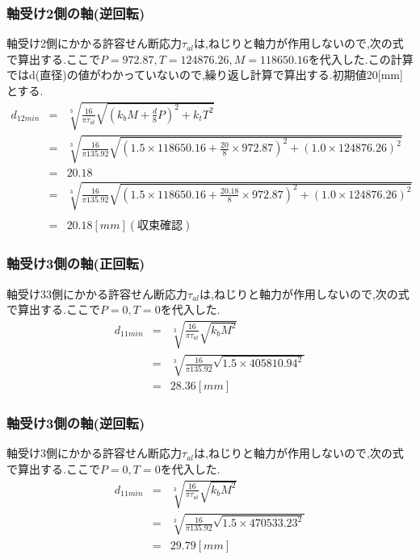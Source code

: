 \subsubsection{軸受け2側の軸(逆回転)}
軸受け2側にかかる許容せん断応力$\tau_{al}$は,ねじりと軸力が作用しないので,次の式で算出する.ここで$P=972.87,T=124876.26, M=118650.16$を代入した.この計算ではd(直径)の値がわかっていないので,繰り返し計算で算出する.初期値20[mm]とする.
\begin{eqnarray}
d_{12min}&=& \sqrt [3]{ \frac{16}{\pi \tau_{al}}\sqrt{(k_bM+\frac{d}{8}P)^2+k_tT^2} }\\
       &=& \sqrt [3]{ \frac{16}{\pi 135.92} \sqrt{(1.5 \times 118650.16 +\frac{20}{8}\times 972.87)^2+(1.0 \times 124876.26)^2} }\\
       &=&20.18\\
       &=& \sqrt [3]{ \frac{16}{\pi 135.92} \sqrt{(1.5 \times 118650.16 +\frac{20.18}{8}\times 972.87)^2+(1.0 \times 124876.26)^2} }\nonumber\\
\\
       &=&20.18[mm](収束確認)
\end{eqnarray}
\subsubsection{軸受け3側の軸(正回転)}
軸受け33側にかかる許容せん断応力$\tau_{al}$は,ねじりと軸力が作用しないので,次の式で算出する.ここで$P=0,T=0$を代入した.
\begin{eqnarray}
d_{11min} &=& \sqrt [3]{ \frac{16}{\pi \tau_{al}}\sqrt{k_bM^2} }\\
         &=& \sqrt [3]{ \frac{16}{\pi 135.92}\sqrt{1.5 \times 405810.94^2} }\\
         &=& 28.36[mm]
\end{eqnarray}
\subsubsection{軸受け3側の軸(逆回転)}
軸受け3側にかかる許容せん断応力$\tau_{al}$は,ねじりと軸力が作用しないので,次の式で算出する.ここで$P=0,T=0$を代入した.
\begin{eqnarray}
d_{11min} &=& \sqrt [3]{ \frac{16}{\pi \tau_{al}}\sqrt{k_bM^2} }\\
         &=& \sqrt [3]{ \frac{16}{\pi 135.92}\sqrt{1.5 \times 470533.23^2} }\\
         &=& 29.79[mm]
\end{eqnarray}
